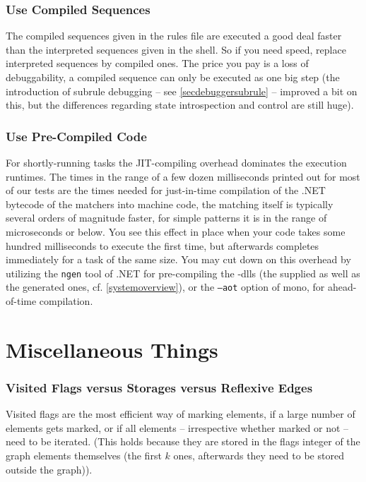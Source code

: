 \subsubsection*{Use Compiled Sequences}
The compiled sequences given in the rules file are executed a good deal faster than the interpreted sequences given in the shell.
So if you need speed, replace interpreted sequences by compiled ones.
The price you pay is a loss of debuggability, a compiled sequence can only be executed as one big step (the introduction of subrule debugging -- see \ref{secdebuggersubrule} -- improved a bit on this, but the differences regarding state introspection and control are still huge).

\subsubsection*{Use Pre-Compiled Code}
For shortly-running tasks the JIT-compiling overhead dominates the execution runtimes.
The times in the range of a few dozen milliseconds printed out for most of our tests are the times needed for just-in-time compilation of the .NET bytecode of the matchers into machine code, the matching itself is typically several orders of magnitude faster, for simple patterns it is in the range of microseconds or below.
You see this effect in place when your code takes some hundred milliseconds to execute the first time, but afterwards completes immediately for a task of the same size.
You may cut down on this overhead by utilizing the \texttt{ngen} tool of .NET for pre-compiling the \GrG-dlls (the supplied as well as the generated ones, cf. \ref{systemoverview}), or the \texttt{--aot} option of mono, for ahead-of-time compilation.


\section{Miscellaneous Things}

\subsubsection*{Visited Flags versus Storages versus Reflexive Edges}
Visited flags are the most efficient way of marking elements, if a large number of elements gets marked, or if all elements -- irrespective whether marked or not -- need to be iterated.
(This holds because they are stored in the flags integer of the graph elements themselves (the first $k$ ones, afterwards they need to be stored outside the graph)).

